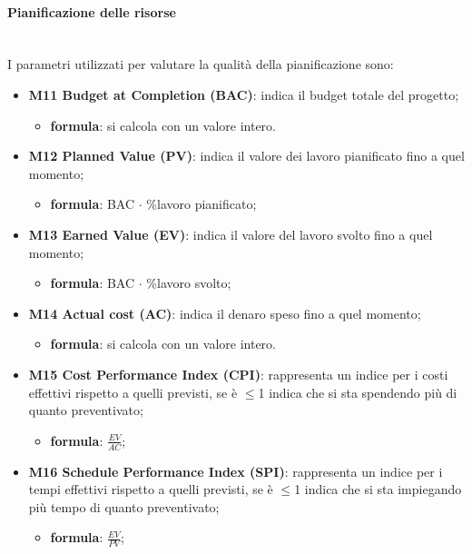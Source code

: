 		\paragraph*{Pianificazione delle risorse}\mbox{}\\ [1mm]
		I parametri utilizzati per valutare la qualità della pianificazione sono:
		\begin{itemize}
			\item \textbf{M11 Budget at Completion (BAC)}: indica il budget totale del progetto\glosp; 
			\begin{itemize}
				\item[] \textbf{formula}: si calcola con un valore intero.
			\end{itemize}
		
			\item \textbf{M12 Planned Value (PV)}: indica il valore dei lavoro pianificato fino a quel momento;
			\begin{itemize}
				\item[] \textbf{formula}: BAC $\cdot$ \%lavoro pianificato;
			\end{itemize}
		
			\item \textbf{M13 Earned Value (EV)}: indica il valore del lavoro svolto fino a quel momento;
			\begin{itemize}
				\item[] \textbf{formula}: BAC $\cdot$ \%lavoro svolto;
			\end{itemize} 
		
			\item \textbf{M14 Actual cost (AC)}: indica il denaro speso fino a quel momento; 
			\begin{itemize}
				\item[] \textbf{formula}: si calcola con un valore intero.
			\end{itemize}
		
			\item \textbf{M15 Cost Performance Index (CPI)}: rappresenta un indice per i costi effettivi rispetto a quelli previsti, se è $\le$1 indica che si sta spendendo più di quanto preventivato;
			\begin{itemize}
				\item[] \textbf{formula}: $\frac{EV}{AC}$; 
			\end{itemize}

			\item \textbf{M16 Schedule Performance Index (SPI)}: rappresenta un indice per i tempi effettivi rispetto a quelli previsti, se è $\le$1 indica che si sta impiegando più tempo di quanto preventivato;
			\begin{itemize}
				\item[] \textbf{formula}: $\frac{EV}{PV}$; 
			\end{itemize}
			 

\end{itemize}
